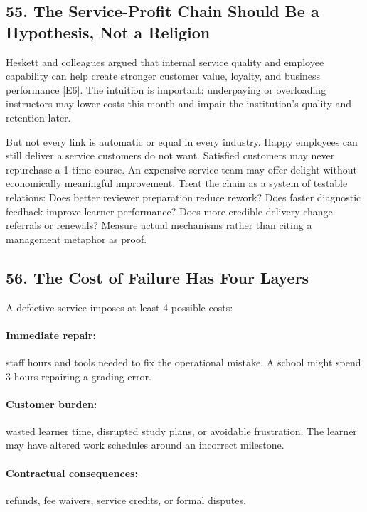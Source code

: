 \subsection*{55. The Service-Profit Chain Should Be a Hypothesis, Not a Religion}

Heskett and colleagues argued that internal service quality and employee capability can help create stronger customer value, loyalty, and business performance [E6]. The intuition is important: underpaying or overloading instructors may lower costs this month and impair the institution's quality and retention later.

But not every link is automatic or equal in every industry. Happy employees can still deliver a service customers do not want. Satisfied customers may never repurchase a 1-time course. An expensive service team may offer delight without economically meaningful improvement. Treat the chain as a system of testable relations: Does better reviewer preparation reduce rework? Does faster diagnostic feedback improve learner performance? Does more credible delivery change referrals or renewals? Measure actual mechanisms rather than citing a management metaphor as proof.

\subsection*{56. The Cost of Failure Has Four Layers}

A defective service imposes at least 4 possible costs:

\paragraph*{Immediate repair:} staff hours and tools needed to fix the operational mistake. A school might spend 3 hours repairing a grading error.

\paragraph*{Customer burden:} wasted learner time, disrupted study plans, or avoidable frustration. The learner may have altered work schedules around an incorrect milestone.

\paragraph*{Contractual consequences:} refunds, fee waivers, service credits, or formal disputes.

